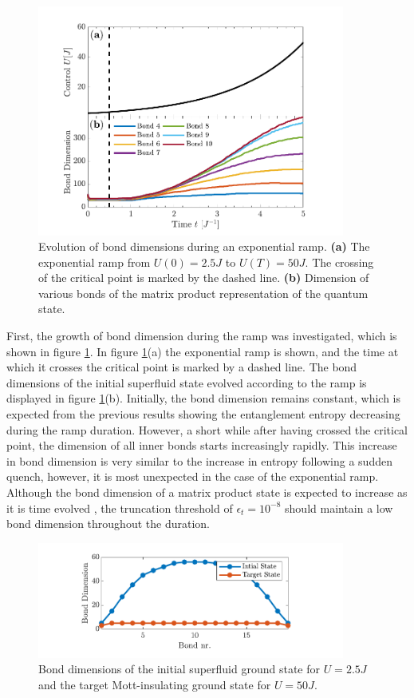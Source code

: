\begin{figure}[h!]
    \centering
    \includegraphics[width=0.9\textwidth]{Figures/L20/BondDimEvolution.pdf}
    \caption{ Evolution of bond dimensions during an exponential ramp. \textbf{(a)} The exponential ramp from $U(0) = 2.5 J$ to $U(T) = 50 J$. The crossing of the critical point is marked by the dashed line. \textbf{(b)} Dimension of various bonds of the matrix product representation of the quantum state. }
    \label{fig:BondDimEvolution}
\end{figure}
First, the growth of bond dimension during the ramp was investigated, which is shown in figure \ref{fig:BondDimEvolution}. In figure \ref{fig:BondDimEvolution}(a) the exponential ramp is shown, and the time at which it crosses the critical point is marked by a dashed line. The bond dimensions of the initial superfluid state evolved according to the ramp is displayed in figure \ref{fig:BondDimEvolution}(b). Initially, the bond dimension remains constant, which is expected from the previous results showing the entanglement entropy decreasing during the ramp duration. However, a short while after having crossed the critical point, the dimension of all inner bonds starts increasingly rapidly. This increase in bond dimension is very similar to the increase in entropy following a sudden quench, however, it is most unexpected in the case of the exponential ramp. Although the bond dimension of a matrix product state is expected to increase as it is time evolved \cite{Daley2004}, the truncation threshold of $\epsilon_t = 10^{-8}$ should maintain a low bond dimension throughout the duration.
\begin{figure}[h!]
    \centering
    \includegraphics[width=0.9\textwidth]{Figures/L20/InitialBondDim.pdf}
    \caption{ Bond dimensions of the initial superfluid ground state for $U = 2.5 J $ and the target Mott-insulating ground state for $U = 50 J $.}
    \label{fig:InitialBondDim}
\end{figure}
